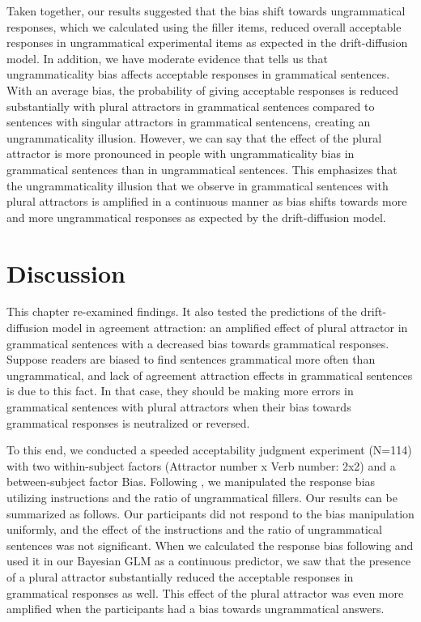 Taken together, our results suggested that the bias shift towards ungrammatical responses, which we calculated using the filler items, reduced overall acceptable responses in ungrammatical experimental items as expected in the drift-diffusion model. In addition, we have moderate evidence that tells us that ungrammaticality bias affects acceptable responses in grammatical sentences. With an average bias, the probability of giving acceptable responses is reduced substantially with plural attractors in grammatical sentences compared to sentences with singular attractors in grammatical sentencens, creating an ungrammaticality illusion. However, we can say that the effect of the plural attractor is more pronounced in people with ungrammaticality bias in grammatical sentences than in ungrammatical sentences. This emphasizes that the ungrammaticality illusion that we observe in grammatical sentences with plural attractors is amplified in a continuous manner as bias shifts towards more and more ungrammatical responses as expected by the drift-diffusion model.

\section{Discussion}

This chapter re-examined \cites{HammerlyEtAl2019} findings. It also tested the predictions of the drift-diffusion model in agreement attraction: an amplified effect of plural attractor in grammatical sentences with a decreased bias towards grammatical responses. 
Suppose readers are biased to find sentences grammatical more often than ungrammatical, and lack of agreement attraction effects in grammatical sentences is due to this fact. 
In that case, they should be making more errors in grammatical sentences with plural attractors when their bias towards grammatical responses is neutralized or reversed. 

To this end, we conducted a speeded acceptability judgment experiment (N=114) with two within-subject factors (Attractor number x Verb number: 2x2) and a between-subject factor Bias. 
Following , we manipulated the response bias utilizing instructions and the ratio of ungrammatical fillers. 
Our results can be summarized as follows. 
Our participants did not respond to the bias manipulation uniformly, and the effect of the instructions and the ratio of ungrammatical sentences was not significant. 
When we calculated the response bias following  and used it in our Bayesian GLM as a continuous predictor, 
we saw that the presence of a plural attractor substantially reduced the acceptable responses in grammatical responses as well.  
This effect of the plural attractor was even more amplified when the participants had a bias towards ungrammatical answers.

